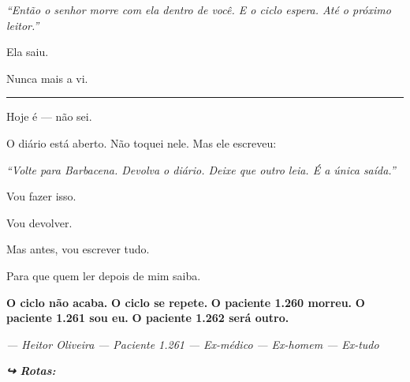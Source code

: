 \noindent \textit{\textquotedblleft{}Então o senhor morre com ela dentro de você. E o ciclo espera. Até o próximo leitor.\textquotedblright{}}

\noindent Ela saiu.

\noindent Nunca mais a vi.

\vspace{0.5em}\noindent\rule{\textwidth}{0.5pt}\vspace{0.5em}

\noindent Hoje é --- não sei.

\noindent O diário está aberto. Não toquei nele. Mas ele escreveu:

\noindent \textit{\textquotedblleft{}Volte para Barbacena. Devolva o diário. Deixe que outro leia. É a única saída.\textquotedblright{}}

\noindent Vou fazer isso.

\noindent Vou devolver.

\noindent Mas antes, vou escrever tudo.

\noindent Para que quem ler depois de mim saiba.

\noindent \textbf{O ciclo não acaba.}
\textbf{O ciclo se repete.}
\textbf{O paciente 1.260 morreu.}
\textbf{O paciente 1.261 sou eu.}
\textbf{O paciente 1.262 será outro.}

\noindent \textit{--- Heitor Oliveira}
\textit{--- Paciente 1.261}
\textit{--- Ex-médico}
\textit{--- Ex-homem}
\textit{--- Ex-tudo}

\vspace{0.5em}
\noindent\textit{\textbf{↪ Rotas:}  \rotasep {} \rotasep {}}